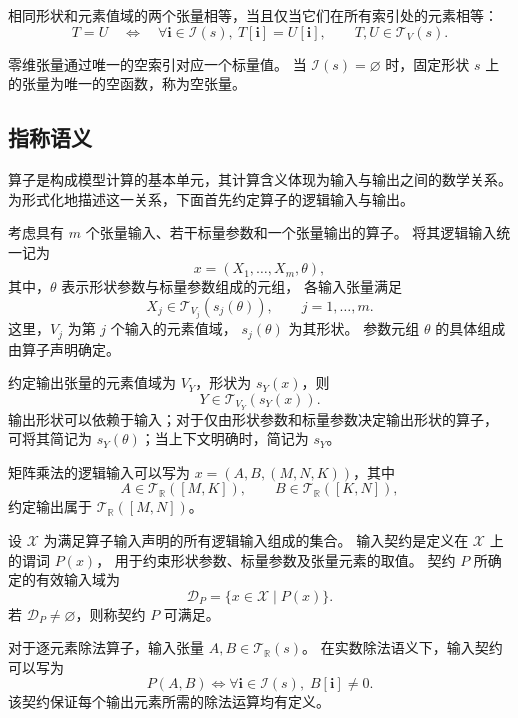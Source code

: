 相同形状和元素值域的两个张量相等，当且仅当它们在所有索引处的元素相等：
\[
  T=U
  \quad\Longleftrightarrow\quad
  \forall\boldsymbol i\in\mathcal I(s),\
  T[\boldsymbol i]=U[\boldsymbol i],
  \qquad T,U\in\mathcal T_V(s).
\]

零维张量通过唯一的空索引对应一个标量值。
当 \(\mathcal I(s)=\varnothing\) 时，固定形状 \(s\) 上的张量为唯一的空函数，称为空张量。


\subsection{指称语义}
\label{subsec:denotational-semantics}

算子是构成模型计算的基本单元，其计算含义体现为输入与输出之间的数学关系。为形式化地描述这一关系，下面首先约定算子的逻辑输入与输出。

考虑具有 \(m\) 个张量输入、若干标量参数和一个张量输出的算子。
将其逻辑输入统一记为
\[
  x=(X_1,\ldots,X_m,\theta),
\]
其中，\(\theta\) 表示形状参数与标量参数组成的元组，
各输入张量满足
\[
  X_j\in\mathcal T_{V_j}(s_j(\theta)),
  \qquad j=1,\ldots,m.
\]
这里，\(V_j\) 为第 \(j\) 个输入的元素值域，
\(s_j(\theta)\) 为其形状。
参数元组 \(\theta\) 的具体组成由算子声明确定。

约定输出张量的元素值域为 \(V_Y\)，形状为 \(s_Y(x)\)，则
\[
  Y\in\mathcal T_{V_Y}(s_Y(x)).
\]
输出形状可以依赖于输入；对于仅由形状参数和标量参数决定输出形状的算子，
可将其简记为 \(s_Y(\theta)\)；当上下文明确时，简记为 \(s_Y\)。

\begin{example}[矩阵乘法的逻辑输入与输出]
    矩阵乘法的逻辑输入可以写为 \(x=(A,B,(M,N,K))\)，其中
    \[
      A\in\mathcal T_{\mathbb R}([M,K]),
      \qquad
      B\in\mathcal T_{\mathbb R}([K,N]),
    \]
    约定输出属于 \(\mathcal T_{\mathbb R}([M,N])\)。
\end{example}

\begin{definition}[输入契约与有效输入域]
    设 \(\mathcal X\) 为满足算子输入声明的所有逻辑输入组成的集合。
    输入契约是定义在 \(\mathcal X\) 上的谓词 \(P(x)\)，
    用于约束形状参数、标量参数及张量元素的取值。
    契约 \(P\) 所确定的有效输入域为
    \[
      \mathcal D_P=\{x\in\mathcal X\mid P(x)\}.
    \]
    若 \(\mathcal D_P\neq\varnothing\)，则称契约 \(P\) 可满足。
\end{definition}

\begin{example}[逐元素除法算子的输入契约]
\label{ex:input-contract-for-elementwise-division}
对于逐元素除法算子，输入张量
\(A,B\in\mathcal T_{\mathbb R}(s)\)。
在实数除法语义下，输入契约可以写为
\[
P(A,B)
\iff
\forall \boldsymbol i\in\mathcal I(s),\;
B[\boldsymbol i]\neq 0.
\]
该契约保证每个输出元素所需的除法运算均有定义。
\end{example}

